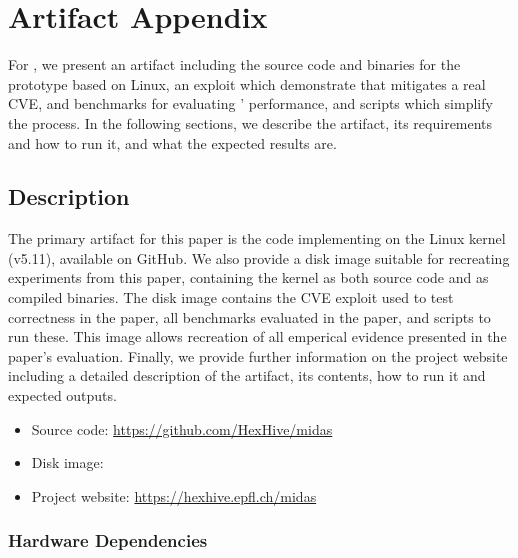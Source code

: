 \section{Artifact Appendix}

For \midas{}, we present an artifact including the source code and 
binaries for the prototype based on Linux, an exploit which demonstrate 
that \midas{} mitigates a real CVE, and benchmarks for evaluating 
\midas{}' performance, and scripts which simplify the process.
In the following sections, we describe the artifact, its requirements 
and how to run it, and what the expected results are.


\subsection{Description}


The primary artifact for this paper is the code implementing \midas{} on the
Linux kernel (v5.11), available on GitHub.
We also provide a disk image suitable for recreating experiments from this
paper, containing the kernel as both source code and as compiled binaries.
The disk image contains the CVE exploit used to test correctness in the 
paper, all benchmarks evaluated in the paper, and scripts to run these.
This image allows recreation of all emperical evidence presented in the 
paper's evaluation.
Finally, we provide further information on the project website including
a detailed description of the artifact, its contents, how to run it 
and expected outputs.
\begin{itemize}
  \item Source code: \url{https://github.com/HexHive/midas}
  \item Disk image: \zenodorecord
  \item Project website: \url{https://hexhive.epfl.ch/midas}
\end{itemize}

\subsubsection{Hardware Dependencies}

